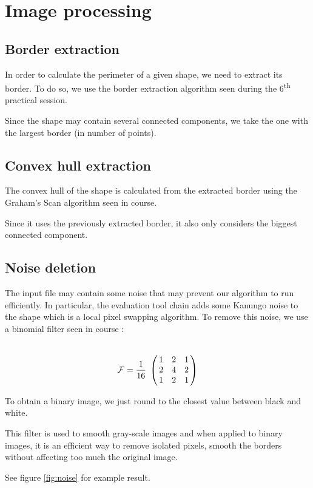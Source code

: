 \documentclass[a4paper,12pt]{article}
\theoremstyle{example}
\theoremstyle{remark}
\theoremstyle{definition}
\begin{document}
\section{Image processing}

\subsection{Border extraction}

In order to calculate the perimeter of a given shape, we need to extract its border. To do so, we use the border extraction algorithm seen during the 6\textsuperscript{th} practical session.


Since the shape may contain several connected components, we take the one with the largest border (in number of points).

\subsection{Convex hull extraction}

The convex hull of the shape is calculated from the extracted border using the Graham’s Scan algorithm seen in course.


Since it uses the previously extracted border, it also only considers the biggest connected component.


\subsection{Noise deletion}

The input file may contain some noise that may prevent our algorithm to run efficiently. In particular, the evaluation tool chain adds some Kanungo noise to the shape which is a local pixel swapping algorithm. To remove this noise, we use a binomial filter seen in course :

\[ \mathcal{F} = \frac{1}{16}\bordermatrix{ &&& \cr
& 1 & 2 & 1 \cr
& 2 & 4 & 2 \cr
& 1 & 2 & 1}\]

To obtain a binary image, we just round to the closest value between black and white.

This filter is used to smooth gray-scale images and when applied to binary images, it is an efficient way to remove isolated pixels, smooth the borders without affecting too much the original image.

See figure \ref{fig:noise} for example result.
\end{document}
